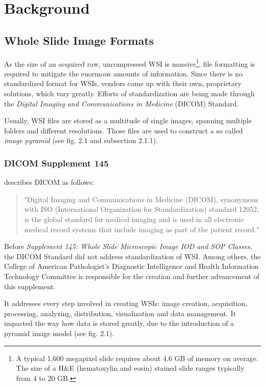 \chapter{Background}
\section{Whole Slide Image Formats}
As the size of an acquired raw, uncompressed WSI is massive\footnote{ A typical 1,600 megapixel slide requires about 4.6 GB of memory on average\cite{Farahanil15}. The size of a H\&E (hematoxylin and eosin) stained slide ranges typically from 4 to 20 GB\cite{Singh11}.}, file formatting is required to mitigate the enormous amounts of information. Since there is no standardized format for WSIs, vendors came up with their own, proprietary solutions, which vary greatly\cite{Cornish13}. Efforts of standardization are being made through the \emph{Digital Imaging and Communications in Medicine} (DICOM) Standard\cite{DICOM10}.

Usually, WSI files are stored as a multitude of single images, spanning multiple folders and different resolutions. Those files are used to construct a so called \emph{image pyramid}\cite{Farahanil15} (see fig. 2.1 and subsection 2.1.1).


\subsection{DICOM Supplement 145}
\cite{Singh11} describes DICOM as follows:
\begin{quotation}
	"Digital Imaging and Communications in Medicine (DICOM), synonymous with ISO (International Organization for Standardization) standard 12052, is the global standard for medical imaging and is used in all electronic medical record systems that include imaging as part of the patient record."
\end{quotation}

Before \emph{Supplement 145: Whole Slide Microscopic Image IOD and SOP Classes}, the DICOM Standard did not address standardization of WSI. Among others, the College of American Pathologist’s Diagnostic Intelligence and Health Information Technology Committee is responsible for the creation and further advancement of this supplement\cite{Singh11}.

It addresses every step involved in creating WSIs: image creation, acquisition, processing, analyzing, distribution, visualization and data management\cite{DICOM10}. It impacted the way how data is stored greatly\cite{Singh11}, due to the introduction of a pyramid image model\cite{DICOM10} (see fig. 2.1).

